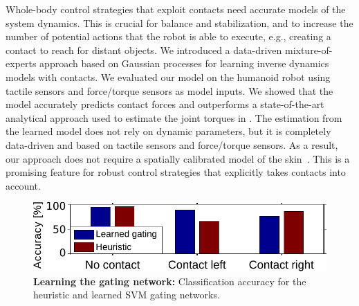 Whole-body control strategies that exploit contacts need accurate models of the
system dynamics. This is crucial for balance and stabilization, and to increase
the number of potential actions that the robot is able to execute, e.g.,
creating a contact to reach for distant objects. We introduced a data-driven
mixture-of-experts approach based on Gaussian processes  for learning inverse
dynamics models with contacts. We evaluated our model on the \robot{} humanoid
robot using tactile sensors and force/torque sensors as model inputs.  We showed
that the model accurately predicts contact forces and outperforms a
state-of-the-art analytical approach used to estimate the joint torques in
\robot{}. The estimation from the learned model does not rely on dynamic
parameters, but it is completely data-driven and based on tactile sensors and
force/torque sensors. As a result, our approach does not require a spatially
calibrated model of the skin~\cite{DelPrete2011,DelPrete2012}. This is a
promising feature for robust control strategies that explicitly takes contacts
into account. 

	\begin{figure}[t]
			\centering
			\includegraphics[width=.5\hsize]{robertoICRA/fig/exp5_accuracy_red}
		\caption{\textbf{Learning the gating network:} Classification accuracy for the heuristic and learned SVM gating networks.
		}
		\label{fig:exp5:accuracy}
	\end{figure}

